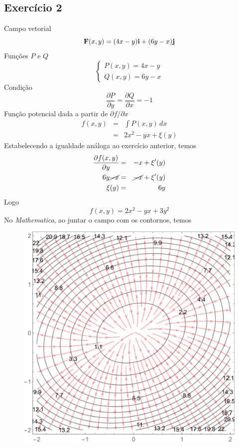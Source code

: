 \documentclass[a4paper, 12pt, brazilian]{article}
\begin{document}
	\subsection{Exercício 2}
	\noindent Campo vetorial
	\begin{equation}
		\textbf{F} (x,y)=(4x-y)\textbf{i}+(6y-x)\textbf{j}
	\end{equation}
	Funções $P$ e $Q$
	$$
	\begin{cases}
		P(x,y)=4x-y\\
		Q(x,y)=6y-x
	\end{cases}
	$$
	Condição
	\begin{equation}
	\dfrac{\partial P}{\partial y}=\dfrac{\partial Q}{\partial x}=-1 
	\end{equation}
	Função potencial dada a partir de $\partial f/\partial x$
	\begin{eqnarray}
		f(x,y)&=&\int P(x,y)\,dx\\
		&=&2x^{2}-yx+\xi (y)
	\end{eqnarray}
	Estabelecendo a igualdade análoga ao exercício anterior, temos
	\begin{eqnarray}
		\dfrac{\partial f(x,y)}{\partial y}&=&-x+\xi'(y)\\
		6y\cancel{-x}&=&\cancel{-x}+\xi'(y)\\
		\xi(y)&=&6y
	\end{eqnarray}
	Logo
	\begin{equation}
		f(x,y)=2x^{2}-yx+3y^{2}
	\end{equation}
	No \textit{Mathematica}, ao juntar o campo com os contornos, temos
	\begin{figure}[H]
		\centering
		\includegraphics[width=0.7\linewidth]{images/g2}
		\label{fig:g2}
	\end{figure}
\end{document}
